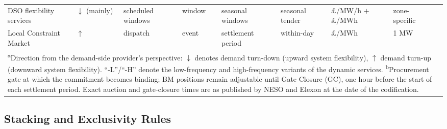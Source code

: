 \documentclass[lettersize,journal]{IEEEtran}
\begin{document}
\begin{table}[!t]
\begin{scriptsize}
\begin{tabular}{lllllllll}
DSO flexibility services & $\downarrow$ (mainly) & scheduled windows & window & seasonal windows & seasonal tender & \pounds/MW/h $+$ \pounds/MWh & zone-specific & \cite{ena2026flex} \\
Local Constraint Market & $\uparrow$ & dispatch & event & settlement period & within-day & \pounds/MWh & 1 MW & \cite{neso2026lcm} \\
\bottomrule
\multicolumn{9}{p{0.97\textwidth}}{\textsuperscript{a}Direction from the demand-side provider's perspective: $\downarrow$ denotes demand turn-down (upward system flexibility), $\uparrow$ demand turn-up (downward system flexibility). ``-L''/``-H'' denote the low-frequency and high-frequency variants of the dynamic services. \textsuperscript{b}Procurement gate at which the commitment becomes binding; BM positions remain adjustable until Gate Closure (GC), one hour before the start of each settlement period. Exact auction and gate-closure times are as published by NESO and Elexon at the date of the codification.} \\
\end{tabular}
\end{scriptsize}
\end{table}

\subsection{Stacking and Exclusivity Rules}
\end{document}
